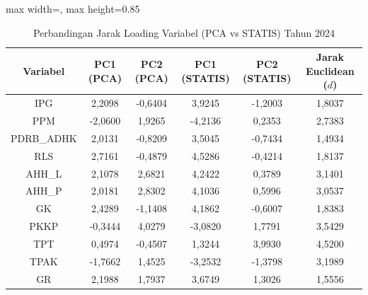 \begin{table}[H]
\centering
\caption{Perbandingan Jarak Loading Variabel (PCA vs STATIS) Tahun 2024} \label{tab:app1jarak_loading_2024}
\begin{adjustbox}{max width=\textwidth, max height=0.85\textheight}
\begin{tabular}{|c|c|c|c|c|c|}
\hline
\textbf{Variabel} & \textbf{PC1 (PCA)} & \textbf{PC2 (PCA)} & \textbf{PC1 (STATIS)} & \textbf{PC2 (STATIS)} & \textbf{Jarak Euclidean ($d$)} \\
\hline
IPG & 2,2098 & -0,6404 & 3,9245 & -1,2003 & 1,8037 \\
PPM & -2,0600 & 1,9265 & -4,2136 & 0,2353 & 2,7383 \\
PDRB\_ADHK & 2,0131 & -0,8209 & 3,5045 & -0,7434 & 1,4934 \\
RLS & 2,7161 & -0,4879 & 4,5286 & -0,4214 & 1,8137 \\
AHH\_L & 2,1078 & 2,6821 & 4,2422 & 0,3789 & 3,1401 \\
AHH\_P & 2,0181 & 2,8302 & 4,1036 & 0,5996 & 3,0537 \\
GK & 2,4289 & -1,1408 & 4,1862 & -0,6007 & 1,8383 \\
PKKP & -0,3444 & 4,0279 & -3,0820 & 1,7791 & 3,5429 \\
TPT & 0,4974 & -0,4507 & 1,3244 & 3,9930 & 4,5200 \\
TPAK & -1,7662 & 1,4525 & -3,2532 & -1,3798 & 3,1989 \\
GR & 2,1988 & 1,7937 & 3,6749 & 1,3026 & 1,5556 \\
\hline
\end{tabular}
\end{adjustbox}
\end{table}